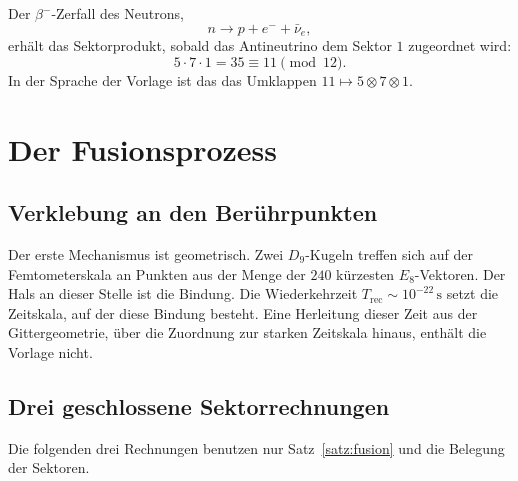 \documentclass[11pt,a4paper]{article}
\theoremstyle{definition}
\theoremstyle{remark}
\newcommand{\Dn}{D_9}
\newcommand{\Ee}{E_8}
\begin{document}
Der \(\beta^-\)-Zerfall des Neutrons,
\begin{equation}
n\to p+e^-+\bar\nu_e,
\end{equation}
erhält das Sektorprodukt, sobald das Antineutrino dem Sektor \(1\) zugeordnet wird:
\begin{equation}
5\cdot 7\cdot 1=35\equiv 11\pmod{12}.
\end{equation}
In der Sprache der Vorlage ist das das Umklappen \(11\mapsto 5\otimes 7\otimes 1\).

\section{Der Fusionsprozess}
\label{sec:fusion}

\subsection{Verklebung an den Berührpunkten}

Der erste Mechanismus ist geometrisch. Zwei \(\Dn\)-Kugeln treffen sich auf der Femtometerskala an Punkten aus der Menge der \(240\) kürzesten \(\Ee\)-Vektoren. Der Hals an dieser Stelle ist die Bindung. Die Wiederkehrzeit \(T_{\mathrm{rec}}\sim 10^{-22}\,\mathrm{s}\) setzt die Zeitskala, auf der diese Bindung besteht. Eine Herleitung dieser Zeit aus der Gittergeometrie, über die Zuordnung zur starken Zeitskala hinaus, enthält die Vorlage nicht.

\subsection{Drei geschlossene Sektorrechnungen}

Die folgenden drei Rechnungen benutzen nur Satz~\ref{satz:fusion} und die Belegung der Sektoren.
\end{document}
